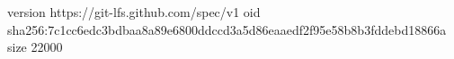 version https://git-lfs.github.com/spec/v1
oid sha256:7c1cc6edc3bdbaa8a89e6800ddccd3a5d86eaaedf2f95e58b8b3fddebd18866a
size 22000
